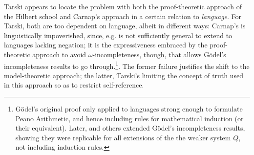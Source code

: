 \documentclass[]{article}
\begin{document}
Tarski appears to locate the problem with both the proof-theoretic approach of the Hilbert school and Carnap's approach in a certain relation to \textit{language}. For Tarski, both are too dependent on language, albeit in different ways: Carnap's is linguistically impoverished, since, e.g. is not sufficiently general to extend to languages lacking negation; it is the expressiveness embraced by the proof-theoretic approach to avoid $\omega$-incompleteness, though, that allows G\"{o}del's incompleteness results to go through.\footnote{G\"{o}del's original proof only applied to languages strong enough to formulate Peano Arithmetic, and hence including rules for mathematical induction (or their equivalent). Later, \cite{Rosser1936} and others extended G\"{o}del's incompleteness results, showing they were replicable for all extensions of the the weaker system $Q$, not including induction rules.}. The former failure justifies the shift to the model-theoretic approach; the latter, Tarski's limiting the concept of truth used in this approach so as to restrict self-reference.
\end{document}
